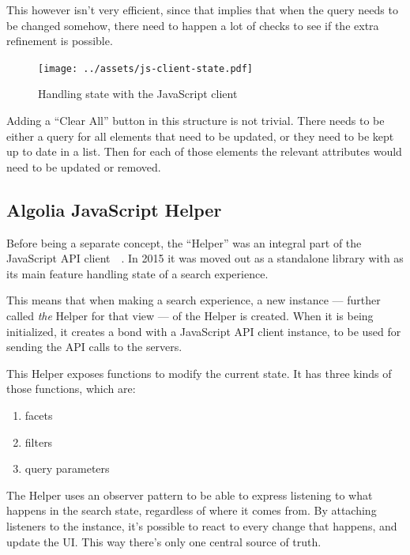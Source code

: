 This however isn't very efficient, since that implies that when the query needs to be changed somehow, there need to happen a lot of checks to see if the extra refinement is possible.

\begin{figure}[H]
  \centering
  \texttt{[image: ../assets/js-client-state.pdf]}
  \caption{Handling state with the JavaScript client}
  \label{figure:js-client-state}
\end{figure}

Adding a ``Clear All'' button in this structure is not trivial. There needs to be either a query for all elements that need to be updated, or they need to be kept up to date in a list. Then for each of those elements the relevant attributes would need to be updated or removed.


\subsection{Algolia JavaScript Helper} %
\label{sub:algolia_js_helper}

Before being a separate concept, the ``Helper'' was an integral part of the JavaScript API client~\cite{algolia-blog-js-client}~. In 2015 it was moved out as a standalone library with as its main feature handling state of a search experience.

This means that when making a search experience, a new instance --- further called \emph{the} Helper for that view --- of the Helper is created. When it is being initialized, it creates a bond with a JavaScript API client instance, to be used for sending the API calls to the servers.

This Helper exposes functions to modify the current state. It has three kinds of those functions, which are:

\begin{enumerate}
  \item facets
  \item filters
  \item query parameters
\end{enumerate}

The Helper uses an observer pattern to be able to express listening to what happens in the search state, regardless of where it comes from. By attaching listeners to the instance, it's possible to react to every change that happens, and update the UI. This way there's only one central source of truth.

